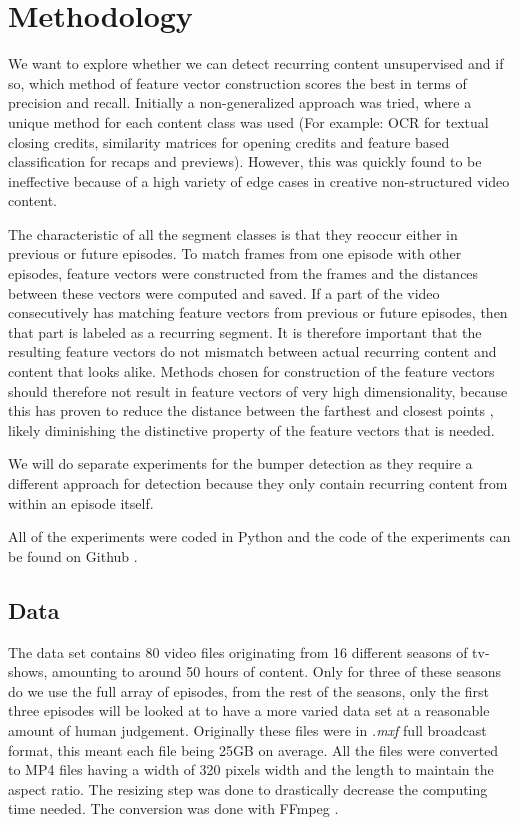 \documentclass{report}
\begin{document}
\chapter{Methodology} \label{methodology}
We want to explore whether we can detect recurring content unsupervised and if so, which method of feature vector construction scores the best in terms of precision and recall. Initially a non-generalized approach was tried, where a unique method for each content class was used (For example: OCR for textual closing credits, similarity matrices for opening credits and feature based classification for recaps and previews). However, this was quickly found to be ineffective because of a high variety of edge cases in creative non-structured video content. 

The characteristic of all the segment classes is that they reoccur either in previous or future episodes. To match frames from one episode with other episodes, feature vectors were constructed from the frames and the distances between these vectors were computed and saved. If a part of the video consecutively has matching feature vectors from previous or future episodes, then that part is labeled as a recurring segment. It is therefore important that the resulting feature vectors do not mismatch between actual recurring content and content that looks alike. Methods chosen for construction of the feature vectors should therefore not result in feature vectors of very high dimensionality, because this has proven to reduce the distance between the farthest and closest points \cite{beyer1999nearest}, likely diminishing the distinctive property of the feature vectors that is needed.

We will do separate experiments for the bumper detection as they require a different approach for detection because they only contain recurring content from within an episode itself.

All of the experiments were coded in Python and the code of the experiments can be found on Github \cite{own-github}.
\section{Data}
The data set contains 80 video files originating from 16 different seasons of tv-shows, amounting to around 50 hours of content. Only for three of these seasons do we use the full array of episodes, from the rest of the seasons, only the first three episodes will be looked at to have a more varied data set at a reasonable amount of human judgement. Originally these files were in \textit{.mxf} full broadcast format, this meant each file being 25GB on average. All the files were converted to MP4 files having a width of 320 pixels width and the length to maintain the aspect ratio. The resizing step was done to drastically decrease the computing time needed. The conversion was done with FFmpeg \cite{ffmpeg}.
\end{document}

